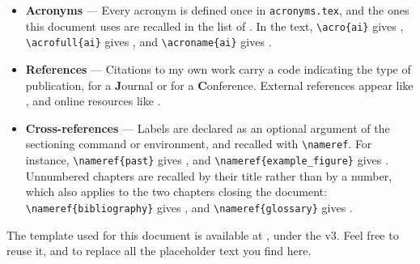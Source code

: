 \begin{itemize}
    \item \textbf{Acronyms} --- Every acronym is defined once in \verb|acronyms.tex|, and the ones this document uses are recalled in the list of . In the text, \verb|\acro{ai}| gives , \verb|\acrofull{ai}| gives , and \verb|\acroname{ai}| gives .
    \item \textbf{References} --- Citations to my own work carry a code indicating the type of publication, \eg \cite{lastname2021journal} for a \textbf{J}ournal or \cite{lastname2022conference} for a \textbf{C}onference. External references appear like \cite{ipsum1998foundational}, and online resources like \cite{placeholder_www}.
    \item \textbf{Cross-references} --- Labels are declared as an optional argument of the sectioning command or environment, and recalled with \verb|\nameref|. For instance, \verb|\nameref{past}| gives , and \verb|\nameref{example_figure}| gives . Unnumbered chapters are recalled by their title rather than by a number, which also applies to the two chapters closing the document: \verb|\nameref{bibliography}| gives , and \verb|\nameref{glossary}| gives .
\end{itemize}

The template used for this document is available at \cite{template_repo}, under the   v3.
Feel free to reuse it, and to replace all the placeholder text you find here.
